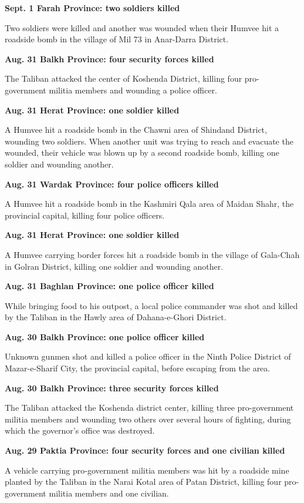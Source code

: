 \textbf{Sept. 1 Farah Province: two soldiers killed}

Two soldiers were killed and another was wounded when their Humvee hit a
roadside bomb in the village of Mil 73 in Anar-Darra District.

\textbf{Aug. 31 Balkh Province: four security forces killed}

The Taliban attacked the center of Koshenda District, killing four
pro-government militia members and wounding a police officer.

\textbf{Aug. 31 Herat Province: one soldier killed}

A Humvee hit a roadside bomb in the Chawni area of Shindand District,
wounding two soldiers. When another unit was trying to reach and
evacuate the wounded, their vehicle was blown up by a second roadside
bomb, killing one soldier and wounding another.

\textbf{Aug. 31 Wardak Province: four police officers killed}

A Humvee hit a roadside bomb in the Kashmiri Qala area of Maidan Shahr,
the provincial capital, killing four police officers.

\textbf{Aug. 31 Herat Province: one soldier killed}

A Humvee carrying border forces hit a roadside bomb in the village of
Gala-Chah in Golran District, killing one soldier and wounding another.

\textbf{Aug. 31 Baghlan Province: one police officer killed}

While bringing food to his outpost, a local police commander was shot
and killed by the Taliban in the Hawly area of Dahana-e-Ghori District.

\textbf{Aug. 30 Balkh Province: one police officer killed}

Unknown gunmen shot and killed a police officer in the Ninth Police
District of Mazar-e-Sharif City, the provincial capital, before escaping
from the area.

\textbf{Aug. 30 Balkh Province: three security forces killed}

The Taliban attacked the Koshenda district center, killing three
pro-government militia members and wounding two others over several
hours of fighting, during which the governor's office was destroyed.

\textbf{Aug. 29 Paktia Province: four security forces and one civilian
killed}

A vehicle carrying pro-government militia members was hit by a roadside
mine planted by the Taliban in the Narai Kotal area of Patan District,
killing four pro-government militia members and one civilian.

